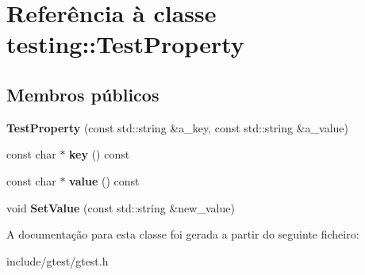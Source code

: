 \hypertarget{classtesting_1_1TestProperty}{\section{Referência à classe testing\-:\-:Test\-Property}
\label{classtesting_1_1TestProperty}
}
\subsection*{Membros públicos}
\begin{DoxyCompactItemize}
\item 
\hypertarget{classtesting_1_1TestProperty_a25a0ccf1c75a92af46a48d3c2a873e6d}{{\bfseries Test\-Property} (const std\-::string \&a\-\_\-key, const std\-::string \&a\-\_\-value)}\label{classtesting_1_1TestProperty_a25a0ccf1c75a92af46a48d3c2a873e6d}

\item 
\hypertarget{classtesting_1_1TestProperty_a2c569d47685b89aa64e737fb11df3aba}{const char $\ast$ {\bfseries key} () const }\label{classtesting_1_1TestProperty_a2c569d47685b89aa64e737fb11df3aba}

\item 
\hypertarget{classtesting_1_1TestProperty_ad46323c18491f365d72d8a4288f54bd6}{const char $\ast$ {\bfseries value} () const }\label{classtesting_1_1TestProperty_ad46323c18491f365d72d8a4288f54bd6}

\item 
\hypertarget{classtesting_1_1TestProperty_a377245335d9f614cd06d1650e3358e1d}{void {\bfseries Set\-Value} (const std\-::string \&new\-\_\-value)}\label{classtesting_1_1TestProperty_a377245335d9f614cd06d1650e3358e1d}

\end{DoxyCompactItemize}


A documentação para esta classe foi gerada a partir do seguinte ficheiro\-:\begin{DoxyCompactItemize}
\item 
include/gtest/gtest.\-h\end{DoxyCompactItemize}
